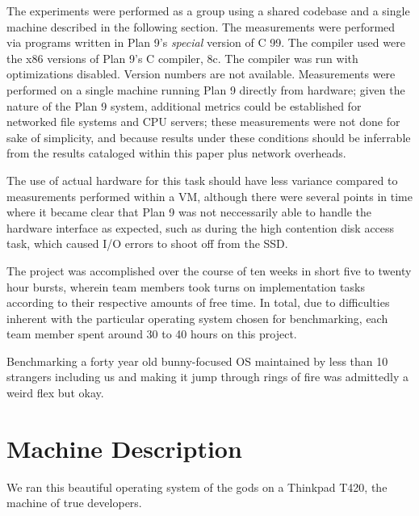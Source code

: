 \documentclass[letterpaper,twocolumn,10pt]{article}
\begin{document}
The experiments were performed as a group using a shared codebase and a single machine described in the following section. The measurements were performed via programs written in Plan 9's \textit{special} version of C 99. The compiler used were the x86 versions of Plan 9's C compiler, 8c. The compiler was run with optimizations disabled. Version numbers are not available. Measurements were performed on a single machine running Plan 9 directly from hardware; given the nature of the Plan 9 system,
additional metrics could be established for networked file systems and CPU servers; these measurements were not done for sake of simplicity, and because results under these conditions should be inferrable from the results cataloged within this paper plus network overheads. 

The use of actual hardware for this task should have less variance compared to measurements performed within a VM, although there were several points in time where it became clear that Plan 9 was not neccessarily able to handle the hardware interface as expected, such as during the high contention disk access task, which caused I/O errors to shoot off from the SSD.

The project was accomplished over the course of ten weeks in short five to twenty hour bursts, wherein team members took turns on implementation tasks according to their respective amounts of free time. In total, due to difficulties inherent with the particular operating system chosen for benchmarking, each team member spent around 30 to 40 hours on this project. 

Benchmarking a forty year old bunny-focused OS maintained by less than 10 strangers including us and making it jump through rings of fire was admittedly a weird flex but okay. 

\section{Machine Description}

We ran this beautiful operating system of the gods on a Thinkpad T420, the machine of true developers.
\end{document}
